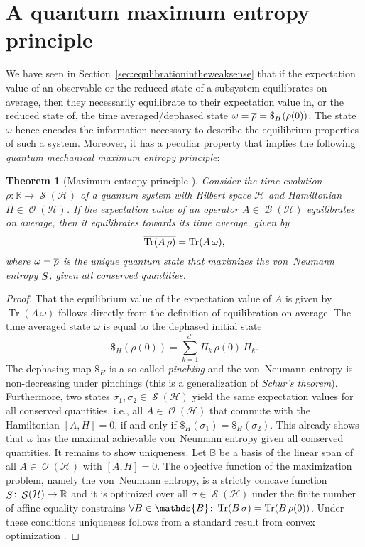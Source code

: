 \documentclass[a4paper,12pt,listof=totoc,index=totoc,bibliography=totoc,headsepline=false,headings=normal,BCOR16.153846mm,DIV12,headinclude,twoside,cleardoublepage=empty,numbers=noenddot,final]{scrreprt}
\theoremstyle{mystyle}
\numberwithin{equation}{section}
\numberwithin{figure}{section}
\numberwithin{lemma}{section}
\newtheorem{theorem}{Theorem}
\numberwithin{theorem}{section}
\numberwithin{corollary}{section}
\numberwithin{definition}{section}
\numberwithin{conjecture}{section}
\numberwithin{observation}{section}
\newcommand{\+}{\mkern2mu}
\newcommand{\oftype}{\colon}
\newcommand{\itholds}{\colon\mathchoice{\quad}{}{}{}}
\renewcommand{\H}{H}
\newcommand{\Basis}{\mathds{B}}
\newcommand{\taverage}[2][]{
  \ifthenelse{\equal{#1}{}}
  {\overline{#2}}
  {\overline{#2}^{#1}}
}
\DeclareMathOperator{\1}{\mathds{1}}
\DeclareMathOperator{\Bop}{\mathcal{B}}
\DeclareMathOperator{\Obs}{\mathcal{O}}
\DeclareMathOperator{\Qst}{\mathcal{S}}
\DeclareMathOperator{\Svn}{\mathnormal{S}}
\DeclareMathOperator{\Tr}{Tr}
\newcommand{\mc}[1]{\mathcal{#1}}
\newcommand{\mcH}{\mc{H}}
\newcommand{\mb}[1]{\mathbb{#1}}
\newcommand{\R}{\mb{R}}
\begin{document}
\section{A quantum maximum entropy principle}
\label{sec:aquantummaximumentropyprinciple}
%
We have seen in Section~\ref{sec:equlibrationintheweaksense} that if the expectation value of an observable or the reduced state of a subsystem equilibrates on average, then they necessarily equilibrate to their expectation value in, or the reduced state of, the time averaged/dephased state $\omega = \taverage{\rho} = \$_\H(\rho(0))$.
The state $\omega$ hence encodes the information necessary to describe the equilibrium properties of such a system.
Moreover, it has a peculiar property that implies the following \emph{quantum mechanical maximum entropy principle}:

\begin{theorem}[Maximum entropy principle \cite{PhysRevLett.10-6}] \label{thm:maximumentropyprinciple}
  Consider the time evolution $\rho\oftype\R\to\Qst(\mcH)$ of a quantum system with Hilbert space $\mcH$ and Hamiltonian $\H \in \Obs(\mcH)$.
  If the expectation value of an operator $A \in \Bop(\mcH)$ equilibrates on average, then it equilibrates towards its time average, given by
  \begin{equation}
    \taverage{\Tr(A\,\rho)} = \Tr(A\,\omega) ,
  \end{equation}
  where $\omega = \taverage{\rho}$ is the unique quantum state that maximizes the von~Neumann entropy $\Svn$, given all conserved quantities.
\end{theorem}
\begin{proof}
  That the equilibrium value of the expectation value of $A$ is given by $\Tr(A\,\omega)$ follows directly from the definition of equilibration on average.
  The time averaged state $\omega$ is equal to the dephased initial state
  \begin{equation}
    \$_H(\rho(0)) = \sum_{k=1}^{d'} \Pi_k\,\rho(0)\,\Pi_k .
  \end{equation}
  The dephasing map $\$_\H$ is a so-called \emph{pinching} and the von~Neumann entropy is non-decreasing under pinchings \cite[Problem II.5.5]{bhatia} (this is a generalization of \emph{Schur's theorem}).
  Furthermore, two states $\sigma_1,\sigma_2 \in \Qst(\mcH)$ yield the same expectation values for all conserved quantities, i.e., all $A \in\Obs(\mcH)$ that commute with the Hamiltonian $[A,\H] = 0$, if and only if $\$_\H(\sigma_1) = \$_\H(\sigma_2)$.
  This already shows that $\omega$ has the maximal achievable von~Neumann entropy given all conserved quantities.
  It remains to show uniqueness.
  Let $\Basis$ be a basis of the linear span of all $A \in\Obs(\mcH)$ with $[A,\H] = 0$.
  The objective function of the maximization problem, namely the von~Neumann entropy, is a strictly concave function $\Svn\oftype\Qst(\mcH) \to \R$ and it is optimized over all $\sigma \in \Qst(\mcH)$ under the finite number of affine equality constrains $\forall B \in \Basis \itholds \Tr(B\,\sigma) = \Tr(B\,\rho(0))$.
  Under these conditions uniqueness follows from a standard result from convex optimization \cite{Boyd2004}.
\end{proof}
\end{document}
